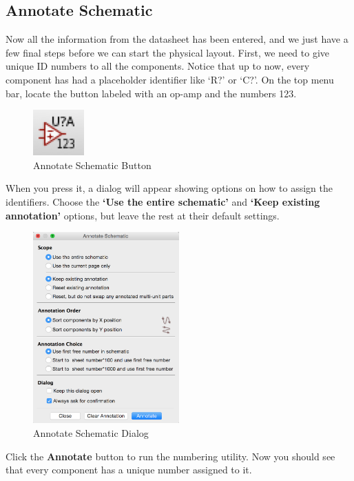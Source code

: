 \documentclass[12pt, oneside]{article}
\begin{document}
\subsection{Annotate Schematic}
Now all the information from the datasheet has been entered, and we just have a few final steps before we can start the physical layout. First, we need to give unique ID numbers to all the components. Notice that up to now, every component has had a placeholder identifier like `R?' or `C?'. On the top menu bar, locate the button labeled with an op-amp and the numbers 123.

\begin{figure}[H]
\includegraphics{AnnotateSchematicButton}
\centering
\caption{Annotate Schematic Button}
\end{figure}

When you press it, a dialog will appear showing options on how to assign the identifiers. Choose the \textbf{`Use the entire schematic'} and \textbf{`Keep existing annotation'} options, but leave the rest at their default settings.

\begin{figure}[H]
\includegraphics[width=0.5\textwidth]{AnnotateSchematic}
\centering
\caption{Annotate Schematic Dialog}
\end{figure}

Click the \textbf{Annotate} button to run the numbering utility. Now you should see that every component has a unique number assigned to it.
\end{document}
